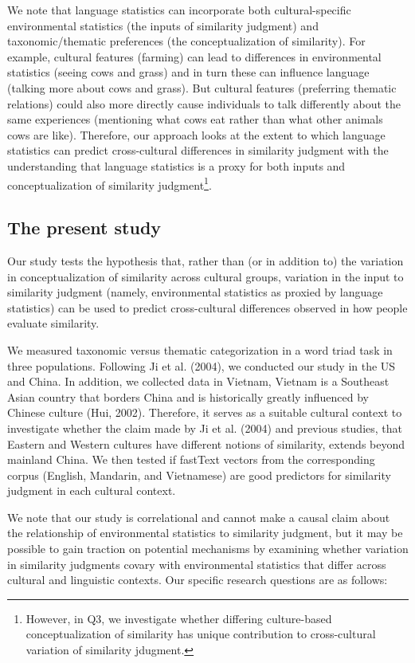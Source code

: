\documentclass[10pt, letterpaper]{article}
\begin{document}
We note that language statistics can incorporate both cultural-specific
environmental statistics (the inputs of similarity judgment) and
taxonomic/thematic preferences (the conceptualization of similarity).
For example, cultural features (farming) can lead to differences in
environmental statistics (seeing cows and grass) and in turn these can
influence language (talking more about cows and grass). But cultural
features (preferring thematic relations) could also more directly cause
individuals to talk differently about the same experiences (mentioning
what cows eat rather than what other animals cows are like). Therefore,
our approach looks at the extent to which language statistics can
predict cross-cultural differences in similarity judgment with the
understanding that language statistics is a proxy for both inputs and
conceptualization of similarity judgment\footnote{However, in Q3, we
  investigate whether differing culture-based conceptualization of
  similarity has unique contribution to cross-cultural variation of
  similarity jdugment.}.

\hypertarget{the-present-study}{%
\subsection{The present study}\label{the-present-study}}

Our study tests the hypothesis that, rather than (or in addition to) the
variation in conceptualization of similarity across cultural groups,
variation in the input to similarity judgment (namely, environmental
statistics as proxied by language statistics) can be used to predict
cross-cultural differences observed in how people evaluate similarity.

We measured taxonomic versus thematic categorization in a word triad
task in three populations. Following Ji et al. (2004), we conducted our
study in the US and China. In addition, we collected data in Vietnam,
Vietnam is a Southeast Asian country that borders China and is
historically greatly influenced by Chinese culture (Hui, 2002).
Therefore, it serves as a suitable cultural context to investigate
whether the claim made by Ji et al. (2004) and previous studies, that
Eastern and Western cultures have different notions of similarity,
extends beyond mainland China. We then tested if fastText vectors from
the corresponding corpus (English, Mandarin, and Vietnamese) are good
predictors for similarity judgment in each cultural context.

We note that our study is correlational and cannot make a causal claim
about the relationship of environmental statistics to similarity
judgment, but it may be possible to gain traction on potential
mechanisms by examining whether variation in similarity judgments covary
with environmental statistics that differ across cultural and linguistic
contexts. Our specific research questions are as follows:~
\end{document}
